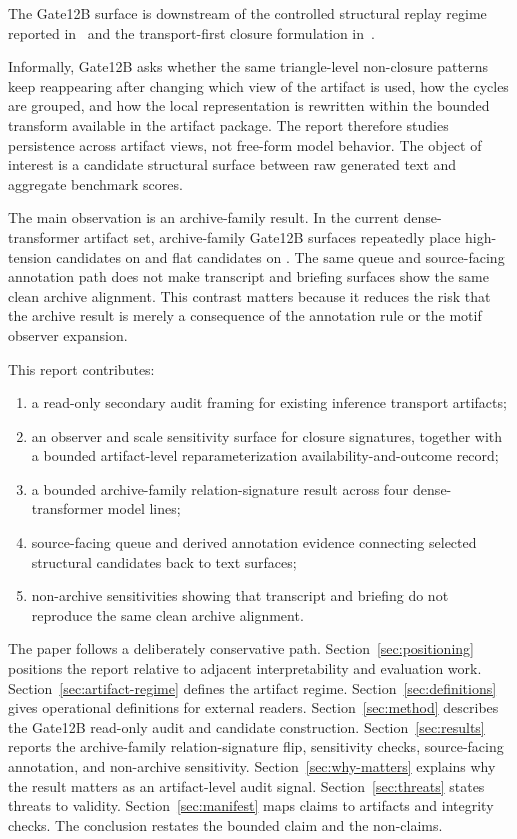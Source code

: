 \documentclass[11pt]{article}
\newcommand{\code}[1]{\texttt{\detokenize{#1}}}
\begin{document}
The Gate12B surface is downstream of the controlled structural replay regime
reported in~\cite{kawasaki2026structural} and the transport-first closure
formulation in~\cite{kawasaki2026telemetry}.

Informally, Gate12B asks whether the same triangle-level non-closure patterns
keep reappearing after changing which view of the artifact is used, how the
cycles are grouped, and how the local representation is rewritten within the
bounded transform available in the artifact package. The report therefore
studies persistence across artifact views, not free-form model behavior. The
object of interest is a candidate structural surface between raw generated text
and aggregate benchmark scores.

The main observation is an archive-family result. In the current
dense-transformer artifact set, archive-family Gate12B surfaces repeatedly
place high-tension candidates on \code{residual_chord=3} and flat candidates on
\code{residual_chord=1|trusted_tree=2}. The same queue and source-facing
annotation path does not make transcript and briefing surfaces show the
same clean archive alignment. This contrast matters because it reduces the
risk that the archive result is merely a consequence of the annotation rule or
the motif observer expansion.

This report contributes:
\begin{enumerate}
    \item a read-only secondary audit framing for existing inference transport
    artifacts;
    \item an observer and scale sensitivity surface for closure signatures,
    together with a bounded artifact-level reparameterization
    availability-and-outcome record;
    \item a bounded archive-family relation-signature result across four
    dense-transformer model lines;
    \item source-facing queue and derived annotation evidence connecting
    selected structural candidates back to text surfaces;
    \item non-archive sensitivities showing that transcript and briefing do not
    reproduce the same clean archive alignment.
\end{enumerate}

The paper follows a deliberately conservative path.
Section~\ref{sec:positioning} positions the report relative to adjacent
interpretability and evaluation work. Section~\ref{sec:artifact-regime} defines the artifact regime.
Section~\ref{sec:definitions} gives operational definitions for external
readers. Section~\ref{sec:method} describes the Gate12B read-only audit and
candidate construction. Section~\ref{sec:results} reports the archive-family
relation-signature flip, sensitivity checks, source-facing annotation, and
non-archive sensitivity. Section~\ref{sec:why-matters} explains why the result
matters as an artifact-level audit signal. Section~\ref{sec:threats} states
threats to validity. Section~\ref{sec:manifest} maps claims to artifacts and
integrity checks. The conclusion restates the bounded claim and the non-claims.
\end{document}
